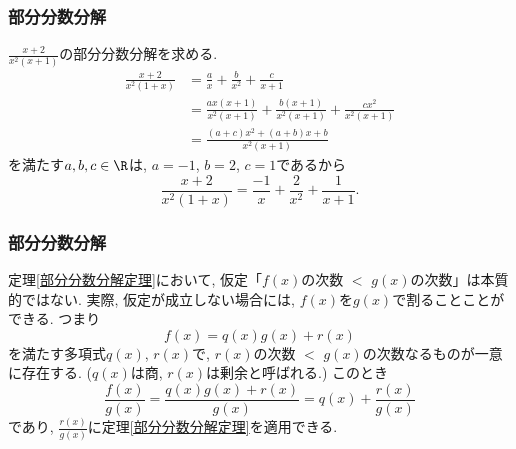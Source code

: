 


\begin{frame}
\frametitle{部分分数分解}

$\frac{x+2}{x^2(x+1)}$の部分分数分解を求める. 
\begin{align*}
\frac{x+2}{x^2(1+x)} & = \frac{a}{x}+  \frac{b}{x^2}+ \frac{c}{x+1} \\
& = \frac{ax(x+1)}{x^2(x+1)}+  \frac{b(x+1)}{x^2(x+1)}+ \frac{cx^2}{x^2(x+1)} \\
& = \frac{(a+c)x^2+(a+b)x+b}{x^2(x+1)}
\end{align*}
を満たす$a,b,c \in \R$は, $a=-1$, $b=2$, $c=1$であるから
$$
\frac{x+2}{x^2(1+x)} 
=  \frac{-1}{x}+  \frac{2}{x^2}+ \frac{1}{x+1}. 
$$

\end{frame}






\begin{frame}
\frametitle{部分分数分解}

定理\ref{部分分数分解定理}において, 仮定「$f(x)$の次数 $<$  $g(x)$の次数」は本質的ではない. 
実際, 仮定が成立しない場合には, $f(x)$を$g(x)$で割ることことができる. つまり
$$
f(x)=q(x)g(x)+r(x)
$$
を満たす多項式$q(x)$, $r(x)$で, $r(x)$の次数 $<$  $g(x)$の次数なるものが一意に存在する. 
($q(x)$は商, $r(x)$は剰余と呼ばれる.) 
このとき
$$
\frac{f(x)}{g(x)}=\frac{q(x)g(x)+r(x)}{g(x)}=q(x)+\frac{r(x)}{g(x)}
$$
であり, $\frac{r(x)}{g(x)}$に定理\ref{部分分数分解定理}を適用できる. 


\end{frame}






